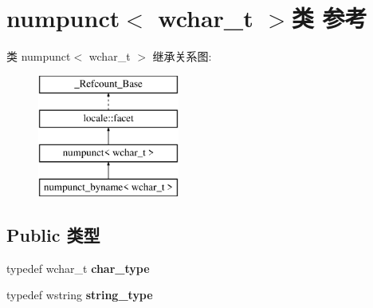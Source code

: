 \hypertarget{classnumpunct_3_01wchar__t_01_4}{}\section{numpunct$<$ wchar\+\_\+t $>$类 参考}
\label{classnumpunct_3_01wchar__t_01_4}
类 numpunct$<$ wchar\+\_\+t $>$ 继承关系图\+:\begin{figure}[H]
\begin{center}
\leavevmode
\includegraphics[height=4.000000cm]{classnumpunct_3_01wchar__t_01_4}
\end{center}
\end{figure}
\subsection*{Public 类型}
\begin{DoxyCompactItemize}
\item 
\mbox{\label{classnumpunct_3_01wchar__t_01_4_a717fd071228b2a8eecf20d47f2864aae}} 
typedef wchar\+\_\+t {\bfseries char\+\_\+type}
\item 
\mbox{\label{classnumpunct_3_01wchar__t_01_4_a7322ae702843b6180c3008cbb0246789}} 
typedef wstring {\bfseries string\+\_\+type}
\end{DoxyCompactItemize}
